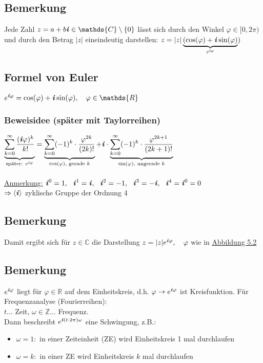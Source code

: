 \documentclass[12pt,titlepage, pdf]{article}
\newcommand{\R}{\mathds{R}}
\newcommand{\Z}{\mathds{Z}}
\newcommand{\C}{\mathds{C}}
\newcommand{\uline}[1]{\underline{#1}}
\renewcommand{\i}{\textbf{\textit{i}}}
\renewcommand{\>}{\rightarrow}
\renewcommand{\*}{\cdot}
\renewcommand{\phi}{\varphi}
\begin{document}
\subsection{Bemerkung}
Jede Zahl $z = a+b\i \in \C \setminus \{0\} $ lässt sich durch den Winkel $\phi \in [0,2\pi)$ und durch den Betrag $|z|$ eineindeutig darstellen: 
$z = |z|\underbrace{(\cos(\phi) + \i \sin(\phi)}_{e^{\i\phi}})$
\subsection{Formel von Euler}
$e^{\i\phi} = \cos(\phi) + \i \sin(\phi),~~~ \phi \in \R$
\subsubsection*{Beweisidee (später mit Taylorreihen)}
$\underbrace{\sum_{k = 0}^{\infty} \frac{(\i\phi)^k}{k!}}_{\text{später: }e^{\i\phi}} = \underbrace{\sum_{k = 0}^{\infty}(-1)^k \cdot \frac{\phi^{2k}}{(2k)!}}_{\cos(\phi)\textrm{, gerade }k} + \i \cdot \underbrace{ \sum_{k = 0}^{\infty}(-1)^k \cdot \frac{\phi^{2k+1}}{(2k+1)!}}_{\sin(\phi)\textrm{, ungerade }k}$\\
\\
\uline{Anmerkung:} $\i^0 = 1,~~ \i^1 = \i,~~ \i^2 = -1,~~ \i^3 = -\i,~~ \i^4 = \i^0 = 0$\\
$\Rightarrow \langle \i \rangle$ zyklische Gruppe der Ordnung 4
\subsection{Bemerkung}
Damit ergibt sich für $z \in \C$ die Darstellung $z = |z| e^{\i\phi},~~~ \phi$ wie in \hyperref[5.2]{Abbildung 5.2}
\subsection{Bemerkung}
$e^{\i\phi}$ liegt für $\phi \in \R$ auf dem Einheitskreis, d.h. $\phi \rightarrow e^{\i\phi}$ ist Kreisfunktion. Für Frequenzanalyse (Fourierreihen): \\
$t$... Zeit, $\omega \in \Z$... Frequenz. \\
Dann beschreibt $e^{\i(t \cdot 2\pi) \omega}$ eine Schwingung, z.B.:
\begin{itemize}
	\item $\omega = 1:$ in einer Zeiteinheit (ZE) wird Einheitskreis 1 mal durchlaufen
	\item $\omega = k:$ in einer ZE wird Einheitskreis $k$ mal durchlaufen
\end{itemize}
\end{document}
